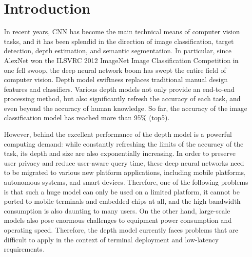 \section{Introduction}
In recent years, CNN has become the main technical means of computer vision tasks, and it has been splendid in the direction of image classification, target detection, depth estimation, and semantic segmentation. In particular, since AlexNet won the ILSVRC 2012 ImageNet Image Classification Competition in one fell swoop, the deep neural network boom has swept the entire field of computer vision. Depth model swiftness replaces traditional manual design features and classifiers. Various depth models not only provide an end-to-end processing method, but also significantly refresh the accuracy of each task, and even beyond the accuracy of human knowledge. So far, the accuracy of the image classification model has reached more than 95\% (top5).

However, behind the excellent performance of the depth model is a powerful computing demand: while constantly refreshing the limits of the accuracy of the task, its depth and size are also exponentially increasing. In order to preserve user privacy and reduce user-aware query time, these deep neural networks need to be migrated to various new platform applications, including mobile platforms, autonomous systems, and smart devices. Therefore, one of the following problems is that such a huge model can only be used on a limited platform, it cannot be ported to mobile terminals and embedded chips at all, and the high bandwidth consumption is also daunting to many users. On the other hand, large-scale models also pose enormous challenges to equipment power consumption and operating speed. Therefore, the depth model currently faces problems that are difficult to apply in the context of terminal deployment and low-latency requirements.

